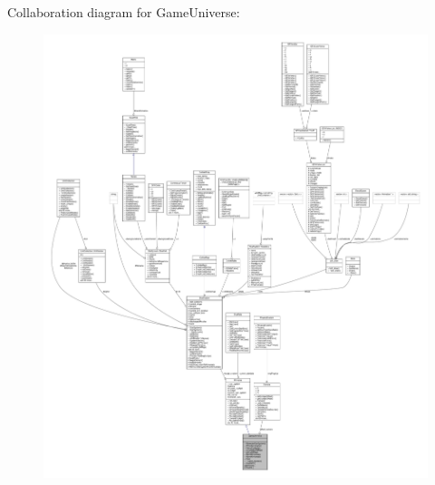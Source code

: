 Collaboration diagram for Game\+Universe\+:
\nopagebreak
\begin{figure}[H]
\begin{center}
\leavevmode
\includegraphics[width=350pt]{dd/db7/classGameUniverse__coll__graph}
\end{center}
\end{figure}
